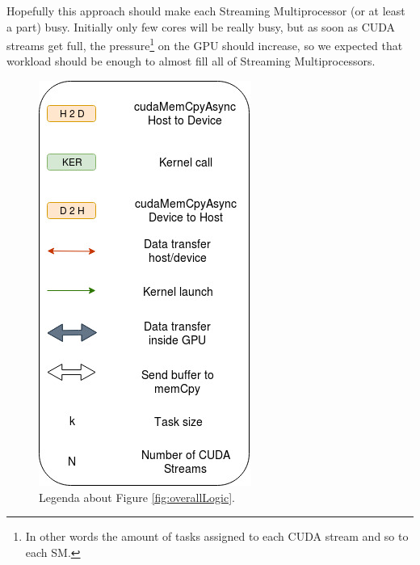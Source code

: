 	
	Hopefully this approach should make each Streaming Multiprocessor (or at least a part) busy.
	Initially only few cores will be really busy, but as soon as CUDA streams get full, the pressure\footnote{In other words the amount of tasks assigned to each CUDA stream and so to each SM.} on the GPU should increase, so we expected that workload should be enough to almost fill all of Streaming Multiprocessors.\\
	\begin{figure}
		\centering
		\includegraphics[width=1\linewidth]{images/logicLegenda.jpg}
		\caption{Legenda about Figure \ref{fig:overallLogic}.}
	\end{figure}
